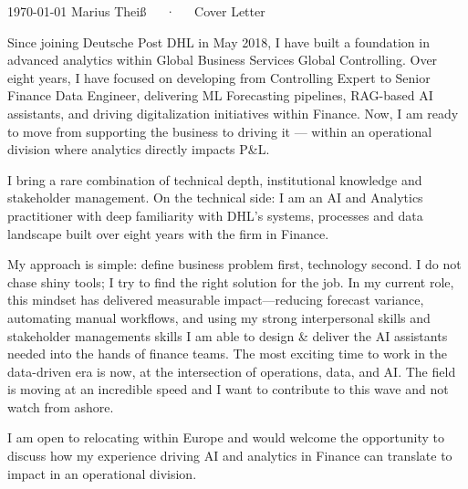 \documentclass[11pt, a4paper]{awesome-cv}
\begin{document}
\makecvheader[R]

\makecvfooter
  {\today}
  {Marius Theiß~~~·~~~Cover Letter}
  {}

\makelettertitle

\begin{cvletter}

  {Since joining Deutsche Post DHL in May 2018, I have built a foundation in advanced
  analytics within Global Business Services Global Controlling. Over eight years, I have 
  focused on developing from Controlling Expert to Senior Finance Data Engineer, delivering 
  ML Forecasting pipelines, RAG-based AI assistants, and driving digitalization initiatives  
  within Finance. Now, I am ready to move from supporting the business to driving it --- 
  within an operational division where analytics directly impacts P\&L.}

  {I bring a rare combination of technical depth, institutional knowledge and stakeholder 
  management. On the technical side: I am an AI and Analytics practitioner with deep familiarity 
  with DHL's systems, processes and data landscape built over eight years with the firm in Finance.

  My approach is simple: define business problem first, technology second. I do not chase 
  shiny tools; I try to find the right solution for the job. In my current role, this mindset 
  has delivered measurable impact—reducing forecast variance, automating manual workflows, 
  and using my strong interpersonal skills and stakeholder managements skills I am able to 
  design \& deliver the AI assistants needed into the hands of finance teams.
  The most exciting time to work in the data-driven era is now, at the intersection of 
  operations, data, and AI. The field is moving at an incredible speed and I want to contribute 
  to this wave and not watch from ashore.

  I am open to relocating within Europe and would welcome the opportunity to discuss 
  how my experience driving AI and analytics in Finance can translate to impact in an 
  operational division.}

\end{cvletter}


\makeletterclosing
\end{document}
